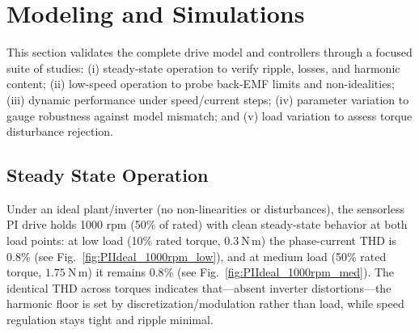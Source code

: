 







\section{Modeling and Simulations}

This section validates the complete drive model and controllers through a focused suite of studies: (i) steady-state operation to verify ripple, losses, and harmonic content; (ii) low-speed operation to probe back-EMF limits and non-idealities; (iii)  dynamic performance under speed/current steps; (iv) parameter variation to gauge robustness against model mismatch; and (v) load variation to assess torque disturbance rejection.



\subsection{Steady State Operation}

Under an ideal plant/inverter (no non-linearities or disturbances), the sensorless PI drive holds 1000 rpm (50\% of rated) with clean steady-state behavior at both load points: at low load (10\% rated torque, \(0.3~\mathrm{N\,m}\)) the phase-current THD is \(\mathbf{0.8\%}\) (see Fig.~\ref{fig:PIIdeal_1000rpm_low}), and at medium load (50\% rated torque, \(1.75~\mathrm{N\,m}\)) it remains \(\mathbf{0.8\%}\) (see Fig.~\ref{fig:PIIdeal_1000rpm_med}). The identical THD across torques indicates that—absent inverter distortions—the harmonic floor is set by discretization/modulation rather than load, while speed regulation stays tight and ripple minimal.








